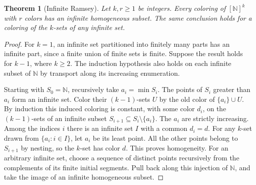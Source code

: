 \documentclass[11pt,oneside,openany]{book}
\theoremstyle{plain}
\newtheorem{theorem}{Theorem}[chapter]
\theoremstyle{definition}
\theoremstyle{remark}
\begin{document}
\begin{theorem}[Infinite Ramsey]\label{p205:W11}
Let \(k,r\ge1\) be integers. Every coloring of \([\mathbb N]^k\)
with \(r\) colors has an infinite homogeneous subset. The same
conclusion holds for a coloring of the \(k\)-sets of any infinite set.
\end{theorem}
\begin{proof}
For \(k=1\), an infinite set partitioned into finitely many
parts has an infinite part, since a finite union of finite sets is
finite. Suppose the result holds for \(k-1\), where \(k\ge2\).
The induction hypothesis also holds on each infinite subset of
\(\mathbb N\) by transport along its increasing enumeration.

Starting with \(S_0=\mathbb N\), recursively take \(a_i=\min S_i\).
The points of \(S_i\) greater than \(a_i\) form an infinite set.
Color their \((k-1)\)-sets \(U\) by the old color of
\(\{a_i\}\cup U\). By induction this induced coloring is constant,
with some color \(d_i\), on the \((k-1)\)-sets of an infinite
subset \(S_{i+1}\subseteq S_i\setminus\{a_i\}\). The \(a_i\) are
strictly increasing. Among the indices \(i\) there is an infinite
set \(I\) with a common \(d_i=d\). For any \(k\)-set drawn from
\(\{a_i:i\in I\}\), let \(a_i\) be its least point. All the other
points belong to \(S_{i+1}\) by nesting, so the \(k\)-set has color \(d\).
This proves homogeneity. For an arbitrary infinite set, choose a
sequence of distinct points recursively from the complements of its
finite initial segments. Pull back along this injection of
\(\mathbb N\), and take the image of an infinite homogeneous subset.
\end{proof}
\end{document}
